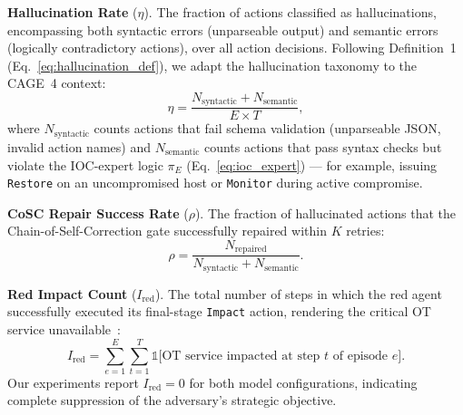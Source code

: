 \textbf{Hallucination Rate} ($\eta$).
The fraction of actions classified as hallucinations, encompassing
both syntactic errors (unparseable output) and semantic errors
(logically contradictory actions), over all action decisions.
Following Definition~1 (Eq.~\ref{eq:hallucination_def}), we
adapt the hallucination taxonomy to the CAGE~4 context:
\begin{equation}
\label{eq:hallucination_rate}
  \eta = \frac{
    N_{\text{syntactic}} + N_{\text{semantic}}
  }{
    E \times T
  },
\end{equation}
where $N_{\text{syntactic}}$ counts actions that fail
schema validation (unparseable JSON, invalid action names) and
$N_{\text{semantic}}$ counts actions that pass syntax checks
but violate the IOC-expert logic $\pi_E$
(Eq.~\ref{eq:ioc_expert}) — for example, issuing \texttt{Restore}
on an uncompromised host or \texttt{Monitor} during active
compromise.

\textbf{CoSC Repair Success Rate} ($\rho$).
The fraction of hallucinated actions that the Chain-of-Self-Correction
gate successfully repaired within $K$ retries:
\begin{equation}
\label{eq:repair_rate}
  \rho = \frac{N_{\text{repaired}}}{N_{\text{syntactic}} + N_{\text{semantic}}}.
\end{equation}

\textbf{Red Impact Count} ($I_{\text{red}}$).
The total number of steps in which the red agent
successfully executed its final-stage \texttt{Impact} action,
rendering the critical OT service
unavailable~\cite{arXiv:2410.17351}:
\begin{equation}
\label{eq:red_impact}
  I_{\text{red}} = \sum_{e=1}^{E}\sum_{t=1}^{T}
    \mathbb{1}\!\bigl[\text{OT service impacted at step } t
    \text{ of episode } e\bigr].
\end{equation}
Our experiments report $I_{\text{red}}=0$ for both model
configurations, indicating complete suppression of the
adversary's strategic objective.


%

